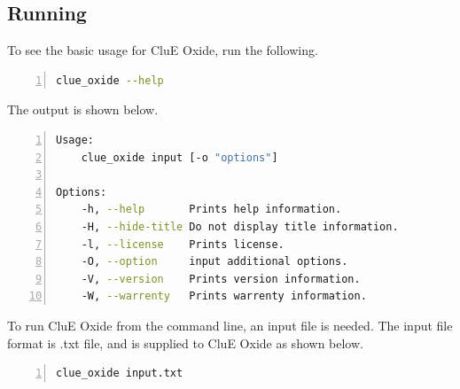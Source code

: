 \documentclass{book}
\begin{document}
\subsection{Running}
To see the basic usage for CluE Oxide, run the following.
\begin{lstlisting}[frame=single,numbers=left,language=bash]
clue_oxide --help
\end{lstlisting}
The output is shown below.
\begin{lstlisting}[frame=single,numbers=left,language=bash]
Usage:
    clue_oxide input [-o "options"]

Options:
    -h, --help       Prints help information.
    -H, --hide-title Do not display title information.
    -l, --license    Prints license.
    -O, --option     input additional options.
    -V, --version    Prints version information.
    -W, --warrenty   Prints warrenty information.
\end{lstlisting}
To run CluE Oxide from the command line, an input file is needed.
The input file format is .txt file, and is supplied to CluE Oxide as shown below. 
\begin{lstlisting}[frame=single,numbers=left,language=bash]
clue_oxide input.txt
\end{lstlisting}
\end{document}
